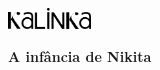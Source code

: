 {%


\movetooddpage


\clearpage
\thispagestyle{empty}
\vspace*{.3cm}
\begin{flushright}
\vspace*{-1.5cm}
\includegraphics[width=2.2cm]{./LOGOTIPO_KALINKA.jpg}
\end{flushright}

\begin{vplace}[.8]
\begin{center}
\hspace{5cm}{\textlt ALEKSEI TOLSTÓI}

\bigskip

{\Huge\textbf{A infância de Nikita}}
\end{center}
\end{vplace}


\pagebreak
\pagestyle{empty}
\scriptsize

}
